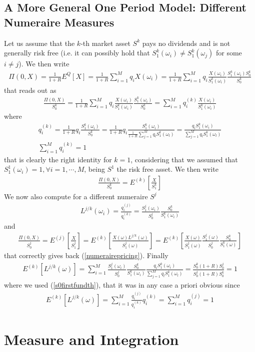 \documentclass[a4paper,10pt]{report}
\theoremstyle{plain}
\theoremstyle{definition}
\newcommand\be{\begin{eqnarray}}    %
\newcommand\ee{\end{eqnarray}}
\begin{document}
\subsection{A More General One Period Model: Different Numeraire Measures}

Let us assume that the $k$-th market asset $S^k$ pays no dividends and is not generally risk free (i.e. it can possibly hold that $S^k_1(\omega_i)\neq S^k_1(\omega_j)$ for some $i \neq j$). 
We then write
\be 
\Pi(0,X)=\frac{1}{1+R}E^Q[X]=\frac{1}{1+R}\sum_{i=1}^M q_i X(\omega_i)
=\frac{1}{1+R}\sum_{i=1}^M q_i \frac{X(\omega_i)}{S^k_1(\omega_i)} \frac{S^k_1(\omega_i)S^k_0}{S^k_0}
\ee
that reads out as
\be 
\frac{\Pi(0,X)}{S^k_0}
=\frac{1}{1+R}\sum_{i=1}^M q_i \frac{X(\omega_i)}{S^k_1(\omega_i)} \frac{S^k_1(\omega_i)}{S^k_0}=\sum_{i=1}^M q^{(k)}_i \frac{X(\omega_i)}{S^k_1(\omega_i)}
\ee
where 
\be 
q^{(k)}_i =\frac{1}{1+R}q_i  \frac{S^k_1(\omega_i)}{S^k_0}=\frac{1}{1+R} q_i  \frac{S^k_1(\omega_i)}{\frac{1}{1+R} \sum_{j=1}^M q_l S^k_1(\omega_l)}=   \frac{q_i S^k_1(\omega_i)}{\sum_{j=1}^M q_l S^k_1(\omega_l)} \\
\sum_{i=1}^M q^{(k)}_i =1
\ee
that is clearly the right identity for $k=1$, considering that we assumed that $S^1_1(\omega_i)=1, \forall i=1,\cdots, M$, being $S^1$ the risk free asset.
We then write
\be 
\label{numerairepricing}
\frac{\Pi(0,X)}{S^k_0} = E^{(k)}\left[\frac{X}{S^k_1}\right]
\ee
We now also compute for a different numeraire $S^j$
\be 
L^{j/k}(\omega_i)= \frac{q^{(j)}_i}{q^{(k)}_i} = \frac{S^j_1(\omega_i)  }{S^j_0 }\frac{S^k_0}{S^k_1(\omega_i)}
\ee
and 
\be 
\frac{\Pi(0,X)}{S^j_0} = E^{(j)}\left[\frac{X}{S^j_1}\right]=E^{(k)}\left[\frac{X(\omega) L^{j/k}(\omega)}{S^j_1(\omega)}\right]=E^{(k)}\left[\frac{X(\omega) }{S^j_1(\omega)} \frac{S^j_1(\omega)  }{S^j_0 }\frac{S^k_0}{S^k_1(\omega)}\right] 
\ee
that correctly gives back (\ref{numerairepricing}).
Finally 
\be 
E^{(k)}\left[L^{j/k}(\omega) \right]=\sum_{i=1}^M  \frac{S^j_1(\omega_i)  }{S^j_0 }\frac{S^k_0}{S^k_1(\omega_i)} \frac{q_i S^k_1(\omega_i)}{\sum_{j=1}^M q_l S^k_1(\omega_l)}=\frac{S^k_0 (1+R)S^j_0 }{S^j_0 (1+R)S^k_0}=1
\ee
where we used (\ref{s0firstfundth}), that it was in any case a priori obvious since
\be 
E^{(k)}\left[L^{j/k}(\omega) \right]=\sum_{i=1}^M  \frac{q^{(j)}_i}{q^{(k)}_i}q^{(k)}_i=\sum_{i=1}^M q^{(j)}_i =1
\ee

\section{Measure and Integration}
\end{document}
